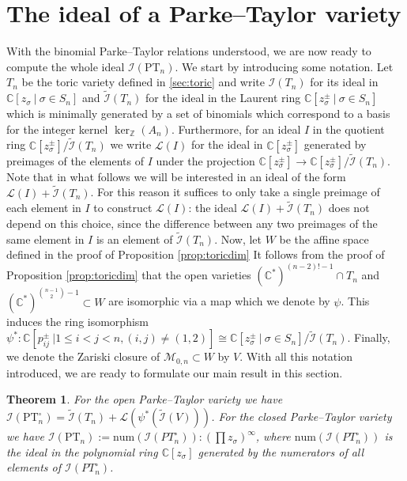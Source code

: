 \documentclass[12pt, reqno]{amsart}
\numberwithin{equation}{section}
\theoremstyle{plain}
\newtheorem{theorem}{Theorem}[section]
\theoremstyle{definition}
\newcommand{\zz}{\mathbb{Z}}
\begin{document}
\section{The ideal of a Parke--Taylor variety} 
\label{sec:idealPT}
With the binomial Parke--Taylor relations understood, we are now ready to compute the whole ideal $\mathcal{I}(\mathrm{PT}_n)$.
We start by introducing some notation. Let $T_n$ be the toric variety defined in \cref{sec:toric} and write $\mathcal{I}(T_n)$ for its ideal in $\mathbb{C}[z_\sigma\ |\ \sigma\in S_n]$ and $\tilde{\mathcal{I}}(T_n)$ for the ideal in the Laurent ring $\mathbb{C}[z_\sigma^\pm\ |\ \sigma\in S_n]$ which is minimally generated by a set of binomials which correspond to a basis for the integer kernel $\ker_\zz(A_n)$. 
Furthermore, for an ideal $I$ in the quotient ring $\mathbb{C}[z_\sigma^\pm]/\tilde{\mathcal{I}}(T_n)$ we write $\mathcal{L}(I)$ for the ideal in $\mathbb{C}[z_\sigma^\pm]$ generated by preimages of the elements of $I$ under the projection $\mathbb{C}[z_\sigma^\pm]\to \mathbb{C}[z_\sigma^\pm]/\tilde{\mathcal{I}}(T_n)$.
Note that in what follows we will be interested in an ideal of the form $\mathcal{L}(I)+\tilde{\mathcal{I}}(T_n)$.
For this reason it suffices to only take a single preimage of each element in $I$ to construct $\mathcal{L}(I)$: the ideal $\mathcal{L}(I)+\tilde{\mathcal{I}}(T_n)$ does not depend on this choice, since the difference between any two preimages of the same element in $I$ is an element of $\tilde{\mathcal{I}}(T_n)$.
Now, let $W$ be the affine space defined in the proof of Proposition \ref{prop:toricdim} 
It follows from the proof of Proposition \ref{prop:toricdim} that the open varieties $(\mathbb{C}^*)^{(n-2)!-1}\cap T_n$ and $(\mathbb{C}^*)^{\binom{n-1}{2}-1}\subset W$ are isomorphic via a map which we denote by $\psi$. 
This induces the ring isomorphism $\psi^*:\mathbb{C}[p_{ij}^\pm\ | 1\leq i<j<n, (i,j)\neq(1,2)] \cong \mathbb{C}[z_\sigma^\pm\ |\ \sigma\in S_n]/\tilde{\mathcal{I}}(T_n)$.
Finally, we denote the Zariski closure of $\mathcal{M}_{0,n}\subset W$ by $V$.
With all this notation introduced, we are ready to formulate our main result in this section.

\begin{theorem} \label{thm:fullideal}
   For the open Parke--Taylor variety we have $\mathcal{I}(\mathrm{PT}_n^\circ)=\tilde{\mathcal{I}}(T_n) +\mathcal{L}(\psi^*(\tilde{\mathcal{I}}(V)))$. For the closed Parke--Taylor variety we have $\mathcal{I}(\mathrm{PT}_n):=\mathrm{num}(\mathcal{I}(PT_n^\circ)):(\prod z_\sigma)^\infty$, where $\mathrm{num}(\mathcal{I}(PT_n^\circ))$ is the ideal in the polynomial ring $\mathbb{C}[z_\sigma]$ generated by the numerators of all elements of $\mathcal{I}(PT_n^\circ)$. 
\end{theorem}
\end{document}
